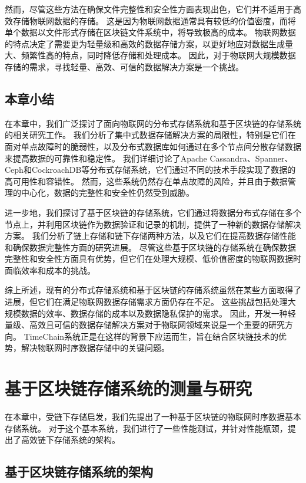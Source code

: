 然而，尽管这些方法在确保文件完整性和安全性方面表现出色，它们并不适用于高效存储物联网数据的存储。
这是因为物联网数据通常具有较低的价值密度，而将单个数据以文件形式存储在区块链文件系统中，将导致极高的成本。
物联网数据的特点决定了需要更为轻量级和高效的数据存储方案，以更好地应对数据生成量大、频繁性高的特点，同时降低存储和处理成本。
因此，对于物联网大规模数据存储的需求，寻找轻量、高效、可信的数据解决方案是一个挑战。

\section{本章小结}
在本章中，我们广泛探讨了面向物联网的分布式存储系统和基于区块链的存储系统的相关研究工作。
我们分析了集中式数据存储解决方案的局限性，特别是它们在面对单点故障时的脆弱性，以及分布式数据库如何通过在多个节点间分散存储数据来提高数据的可靠性和稳定性。
我们详细讨论了Apache Cassandra、Spanner、Ceph和CockroachDB等分布式存储系统，它们通过不同的技术手段实现了数据的高可用性和容错性。
然而，这些系统仍然存在单点故障的风险，并且由于数据管理的中心化，数据的完整性和安全性仍然受到威胁。

进一步地，我们探讨了基于区块链的存储系统，它们通过将数据分布式存储在多个节点上，并利用区块链作为数据验证和记录的机制，提供了一种新的数据存储解决方案。
我们分析了链上存储和链下存储两种方法，以及它们在提高数据存储性能和确保数据完整性方面的研究进展。
尽管这些基于区块链的存储系统在确保数据完整性和安全性方面具有优势，但它们在处理大规模、低价值密度的物联网数据时面临效率和成本的挑战。

综上所述，现有的分布式存储系统和基于区块链的存储系统虽然在某些方面取得了进展，但它们在满足物联网数据存储需求方面仍存在不足。
这些挑战包括处理大规模数据的效率、数据存储的成本以及数据隐私保护的需求。
因此，开发一种轻量级、高效且可信的数据存储解决方案对于物联网领域来说是一个重要的研究方向。
TimeChain系统正是在这样的背景下应运而生，旨在结合区块链技术的优势，解决物联网时序数据存储中的关键问题。

\chapter{基于区块链存储系统的测量与研究}
\label{sec:baseline}
在本章中，受链下存储启发，我们先提出了一种基于区块链的物联网时序数据基本存储系统。
对于这个基本系统，我们进行了一些性能测试，并针对性能瓶颈，提出了高效链下存储系统的架构。

\section{基于区块链存储系统的架构}

